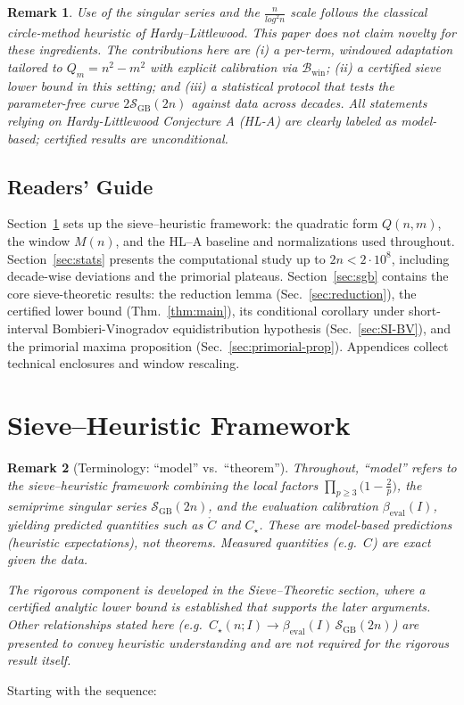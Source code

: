 \documentclass[11pt]{article}
\theoremstyle{inline}
\newtheorem*{remark}{Remark}
\theoremstyle{break}
\theoremstyle{break}
\theoremstyle{break}
\theoremstyle{break}
\theoremstyle{break}
\theoremstyle{break}
\theoremstyle{break}
\theoremstyle{inline}
\newcommand{\twin}{{\scriptscriptstyle\mathrm{win}}}
\newcommand{\Cmeas}{C}              %
\newcommand{\Cpred}{\mathring{C}}   %
\newcommand{\SGB}{\mathcal{S}_{\scriptscriptstyle\mathrm{GB}}}
\newcommand{\Bwin}{\mathcal{B}_\twin}
\newcommand{\betacal}{\beta_{\mathrm{eval}}}
\begin{document}
\begin{remark}
Use of the singular series and the \(  \frac{n}{log^2 n} \) scale follows the classical circle-method heuristic of Hardy–Littlewood.\cite{HardyLittlewood1923} This paper does not claim novelty for these ingredients. The contributions here are (i) a per-term, windowed adaptation tailored to \( Q_m = n^2 - m^2 \)  with explicit calibration via \( \Bwin \); (ii) a certified sieve lower bound in this setting; and (iii) a statistical protocol that tests the parameter-free curve \( 2\SGB(2n) \) against data across decades. All statements relying on Hardy-Littlewood Conjecture A (HL-A) are clearly labeled as model-based; certified results are unconditional.
\end{remark}


\subsection{Readers’ Guide}
Section~\ref{sec:framework} sets up the sieve–heuristic framework: the quadratic form \(Q(n,m)\), the window \(M(n)\), and the HL–A baseline and normalizations used throughout. 
Section~\ref{sec:stats} presents the computational study up to \(2n<2\cdot 10^8\), including decade-wise deviations and the primorial plateaus.
Section~\ref{sec:sgb} contains the core sieve-theoretic results: the reduction lemma (Sec.~\ref{sec:reduction}), the certified lower bound (Thm.~\ref{thm:main}), its conditional corollary under short-interval Bombieri-Vinogradov equidistribution hypothesis (Sec.~\ref{sec:SI-BV}), and the primorial maxima proposition (Sec.~\ref{sec:primorial-prop}).
Appendices collect technical enclosures and window rescaling.


\section{Sieve--Heuristic Framework}\label{sec:framework}

\begin{remark}[Terminology: ``model'' vs.\ ``theorem'']
Throughout, ``model'' refers to the sieve–heuristic framework combining the local
factors \( \prod_{p\ge3}\!\bigl(1-\tfrac{2}{p}\bigr) \), the semiprime singular series
\( \SGB(2n) \), and the evaluation calibration \( \betacal(I) \), yielding
predicted quantities such as \( \Cpred \) and \( C_\star \). These are
\emph{model-based predictions} (heuristic expectations), not theorems.
Measured quantities (e.g.\ \( \Cmeas \)) are exact given the data.

The rigorous component is developed in the Sieve–Theoretic section, where a certified analytic lower bound is established that supports the later arguments.
Other relationships stated here (e.g.\ \( C_\star(n;I)\to \betacal(I)\,\SGB(2n) \))
are presented to convey heuristic understanding and are not required
for the rigorous result itself.
\end{remark}
Starting with the sequence:
\end{document}
